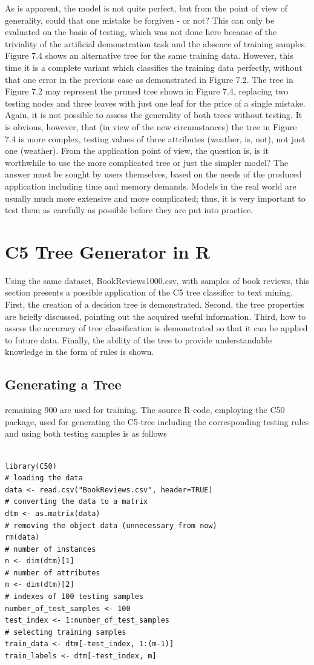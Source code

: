 \documentclass[11pt,openany,executivepaper]{book}
\begin{document}
As is apparent, the model is not quite perfect, but from the point of view
of generality, could that one mistake be forgiven - or not? This can only be
evaluated on the basis of testing, which was not done here because of the triviality
of the artificial demonstration task and the absence of training samples.
Figure 7.4 shows an alternative tree for the same training data. However, this
time it is a complete variant which classifies the training data perfectly, without
that one error in the previous case as demonstrated in Figure 7.2. The tree in
Figure 7.2 may represent the pruned tree shown in Figure 7.4, replacing two
testing nodes and three leaves with just one leaf for the price of a single mistake.
Again, it is not possible to assess the generality of both trees without testing. It is
obvious, however, that (in view of the new circumstances) the tree in Figure 7.4
is more complex, testing values of three attributes (weather, is, not), not just one
(weather).
From the application point of view, the question is, is it worthwhile to use the
more complicated tree or just the simpler model? The answer must be sought by
users themselves, based on the needs of the produced application including time
and memory demands. Models in the real world are usually much more extensive
and more complicated; thus, it is very important to test them as carefully as
possible before they are put into practice.

\section{C5 Tree Generator in R}

Using the same dataset, BookReviews1000.csv, with samples of book reviews,
this section presents a possible application of the C5 tree classifier to text mining.
First, the creation of a decision tree is demonstrated. Second, the tree properties are briefly discussed, pointing out the acquired useful information. Third,
how to assess the accuracy of tree classification is demonstrated so that it can be
applied to future data. Finally, the ability of the tree to provide understandable
knowledge in the form of rules is shown.

\subsection{Generating a Tree}

remaining 900 are used for training. The source R-code, employing the C50 package, used for generating the C5-tree including the corresponding testing rules and
using both testing samples is as follows
\begin{verbatim}

library(C50)
# loading the data
data <- read.csv("BookReviews.csv", header=TRUE)
# converting the data to a matrix
dtm <- as.matrix(data)
# removing the object data (unnecessary from now)
rm(data)
# number of instances
n <- dim(dtm)[1]
# number of attributes
m <- dim(dtm)[2]
# indexes of 100 testing samples
number_of_test_samples <- 100
test_index <- 1:number_of_test_samples
# selecting training samples
train_data <- dtm[-test_index, 1:(m-1)]
train_labels <- dtm[-test_index, m]
\end{verbatim}
\end{document}
